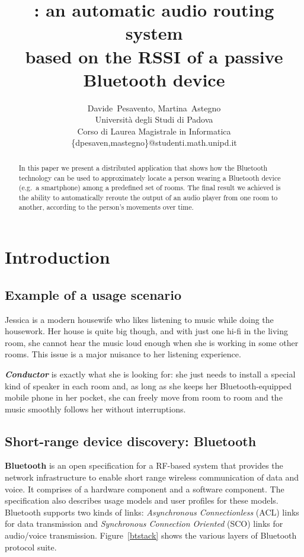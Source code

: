 \documentclass[conference]{IEEEtran}
\title{\Conductor{}: an automatic audio routing system\\based on the RSSI of a passive Bluetooth device}
\author{Davide~Pesavento, Martina~Astegno \\
	Università degli Studi di Padova \\
	Corso di Laurea Magistrale in Informatica \\
	\{dpesaven,mastegno\}@studenti.math.unipd.it
}
\newcommand{\Conductor}{\textsl{Conductor}}
\begin{document}
\maketitle

\begin{abstract}
In this paper we present a distributed application that shows how the Bluetooth technology can be used to approximately locate a person wearing a Bluetooth device (e.g.\ a smartphone) among a predefined set of rooms. The final result we achieved is the ability to automatically reroute the output of an audio player from one room to another, according to the person's movements over time.
\end{abstract}



\vspace{4mm}
\section{Introduction}

\subsection{Example of a usage scenario}
Jessica is a modern housewife who likes listening to music while doing the housework. Her house is quite big though, and with just one hi-fi in the living room, she cannot hear the music loud enough when she is working in some other rooms. This issue is a major nuisance to her listening experience.

\textbf{\Conductor{}} is exactly what she is looking for: she just needs to install a special kind of speaker in each room and, as long as she keeps her Bluetooth-equipped mobile phone in her pocket, she can freely move from room to room and the music smoothly follows her without interruptions.

\subsection{Short-range device discovery: Bluetooth}
\textbf{Bluetooth} is an open specification for a RF-based system that provides the network infrastructure to enable short range wireless communication of data and voice. It comprises of a hardware component and a software component. The specification also describes usage models and user profiles for these models.
Bluetooth supports two kinds of links: \textit{Asynchronous Connectionless} (ACL) links for data transmission and \textit{Synchronous Connection Oriented} (SCO) links for audio/voice transmission. Figure~\ref{btstack} shows the various layers of Bluetooth protocol suite.
\end{document}
